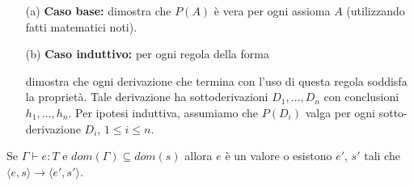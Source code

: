 \begin{enumerate}
    \item[(a)] \textbf{Caso base:} dimostra che $P(A)$ è vera per ogni assioma
    $A$ (utilizzando fatti matematici noti).
    \item[(b)] \textbf{Caso induttivo:} per ogni regola della forma 
    
    \begin{prooftree}
    \end{prooftree}

    dimostra che ogni derivazione che termina con
    l'uso di questa regola soddisfa la proprietà. Tale derivazione ha sottoderivazioni
    $D_1, \dots, D_n$ con conclusioni $h_1, \dots, h_n$. Per ipotesi induttiva,
    assumiamo che $P(D_i)$ valga per ogni sotto-derivazione $D_i$, $1 \leq i \leq n$.
\end{enumerate}
\begin{theorem}[Progress]
  Se $\Gamma \vdash e : T$ e $dom(\Gamma) \subseteq dom(s)$ allora $e$ è
  un valore o esistono $e'$, $s'$ tali che $\langle e, s \rangle \rightarrow \langle e', s' \rangle$.
\end{theorem}
